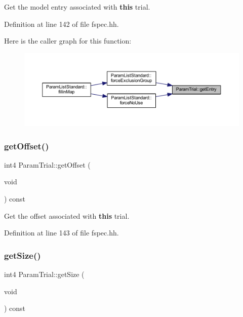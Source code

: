 Get the model entry associated with {\bfseries{this}} trial. 



Definition at line 142 of file fspec.\+hh.

Here is the caller graph for this function\+:
\nopagebreak
\begin{figure}[H]
\begin{center}
\leavevmode
\includegraphics[width=350pt]{class_param_trial_aa4c4b22cd813b218292b6bc7db4e00e1_icgraph}
\end{center}
\end{figure}
\mbox{\label{class_param_trial_a7f3302664c5c80a9d9f6ca3ce4ae38d7}} 
\subsubsection{\texorpdfstring{getOffset()}{getOffset()}}
{\footnotesize\ttfamily int4 Param\+Trial\+::get\+Offset (\begin{DoxyParamCaption}\item[{void}]{ }\end{DoxyParamCaption}) const\hspace{0.3cm}{\ttfamily [inline]}}



Get the offset associated with {\bfseries{this}} trial. 



Definition at line 143 of file fspec.\+hh.

\mbox{\label{class_param_trial_a92758568d74f243b6680258fa8cb440a}} 
\subsubsection{\texorpdfstring{getSize()}{getSize()}}
{\footnotesize\ttfamily int4 Param\+Trial\+::get\+Size (\begin{DoxyParamCaption}\item[{void}]{ }\end{DoxyParamCaption}) const\hspace{0.3cm}{\ttfamily [inline]}}



